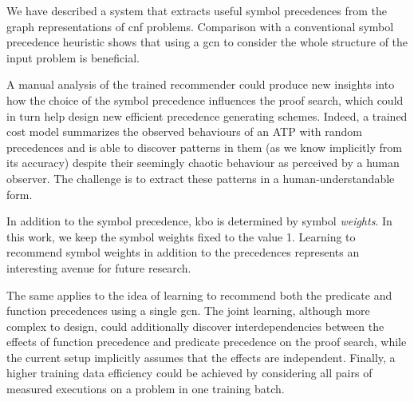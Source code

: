 
We have described a system that extracts useful symbol precedences from the graph representations of \gls{cnf} problems.
Comparison with a conventional symbol precedence heuristic shows that using a \gls{gcn}
to consider the whole structure of the input problem is beneficial.

A manual analysis of the trained recommender could produce new insights into how the choice of the symbol precedence influences the proof search,
which could in turn help design new efficient precedence generating schemes.
Indeed, a trained cost model summarizes the observed behaviours of an ATP with random precedences
and is able to discover patterns in them (as we know implicitly from its accuracy) 
despite their seemingly chaotic behaviour as perceived by a human observer.
The challenge is to extract these patterns in a human-understandable form.

In addition to the symbol precedence,
\gls{kbo} is determined by symbol \emph{weights}.
In this work, we keep the symbol weights fixed to the value 1.
Learning to recommend symbol weights in addition to the precedences
represents an interesting avenue for future research.

The same applies to the idea of learning to recommend 
both the predicate and function precedences using a single \gls{gcn}.
The joint learning, although more complex to design, could 
additionally discover interdependencies
between the effects of function precedence and predicate precedence on the proof search,
while the current setup implicitly assumes that the effects are independent.
Finally, a higher training data efficiency could be achieved by considering all pairs of measured executions on a problem
in one training batch.



